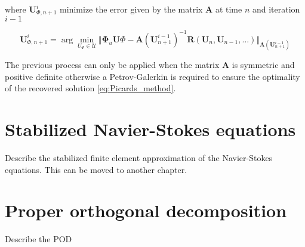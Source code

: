 \documentclass[twoside,11pt]{Latex/Classes/PhDthesisPSnPDF_jacob}
\newcommand{\argmin}{\arg\!\min}
\begin{document}
where $\mathbf{U}_{\Phi,n+1}^{i}$ minimize the error given by the matrix $\mathbf{A}$ at time $n$ and iteration $i-1$

\begin{equation}
\mathbf{U}_{\Phi,n+1}^{i} = \argmin_{U_{\Phi}\in\mathcal{U}} \Vert \mathbf{\Phi}_u\mathbf{U}\Phi - \mathbf{A}(\mathbf{U}_{n+1}^{i-1})^{-1} \mathbf{R}(\mathbf{U}_{n},\mathbf{U}_{n-1},\ldots) \Vert_{\mathbf{A}(\mathbf{U}_{n+1}^{i-1})}
\end{equation}

The previous process can only be applied when the matrix $\mathbf{A}$ is symmetric and positive definite otherwise a Petrov-Galerkin is required to ensure the optimality of the recovered solution \ref{eq:Picards_method}.


\section{Stabilized Navier-Stokes equations}

Describe the stabilized finite element approximation of the Navier-Stokes equations. This can be moved to another chapter.


\section{Proper orthogonal decomposition}

Describe the POD


\end{document}
